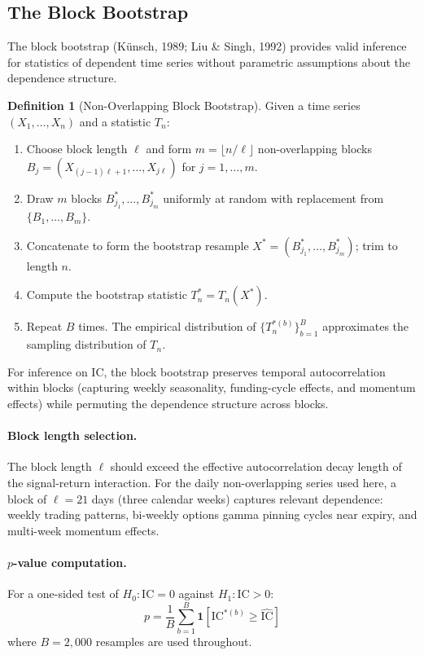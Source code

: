 \documentclass[12pt, a4paper]{article}
\theoremstyle{plain}
\theoremstyle{definition}
\newtheorem{definition}{Definition}[section]
\newcommand{\IC}{\mathrm{IC}}
\begin{document}
\subsection{The Block Bootstrap}
\label{sec:bootstrap}

The block bootstrap (Künsch, 1989; Liu \& Singh, 1992) provides valid inference
for statistics of dependent time series without parametric assumptions about
the dependence structure.

\begin{definition}[Non-Overlapping Block Bootstrap]
  Given a time series $(X_1, \ldots, X_n)$ and a statistic $T_n$:
  \begin{enumerate}
    \item Choose block length $\ell$ and form $m = \lfloor n/\ell \rfloor$
          non-overlapping blocks $B_j = (X_{(j-1)\ell+1}, \ldots, X_{j\ell})$
          for $j = 1, \ldots, m$.
    \item Draw $m$ blocks $B_{j_1}^*, \ldots, B_{j_m}^*$ uniformly at random
          with replacement from $\{B_1, \ldots, B_m\}$.
    \item Concatenate to form the bootstrap resample
          $X^* = (B_{j_1}^*, \ldots, B_{j_m}^*)$; trim to length $n$.
    \item Compute the bootstrap statistic $T_n^* = T_n(X^*)$.
    \item Repeat $B$ times.  The empirical distribution of
          $\{T_n^{*(b)}\}_{b=1}^B$ approximates the sampling distribution
          of $T_n$.
  \end{enumerate}
\end{definition}

For inference on $\IC$, the block bootstrap preserves temporal autocorrelation
within blocks (capturing weekly seasonality, funding-cycle effects, and
momentum effects) while permuting the dependence structure across blocks.

\paragraph{Block length selection.}
The block length $\ell$ should exceed the effective autocorrelation decay
length of the signal-return interaction.  For the daily non-overlapping series
used here, a block of $\ell = 21$ days (three calendar weeks) captures
relevant dependence: weekly trading patterns, bi-weekly options gamma pinning
cycles near expiry, and multi-week momentum effects.

\paragraph{$p$-value computation.}
For a one-sided test of $H_0 : \IC = 0$ against $H_1 : \IC > 0$:
\begin{equation}
  p = \frac{1}{B}\sum_{b=1}^B \mathbf{1}\!\left[\IC^{*(b)} \geq \widehat{\IC}\right]
  \label{eq:pvalue}
\end{equation}
where $B = 2{,}000$ resamples are used throughout.
\end{document}
